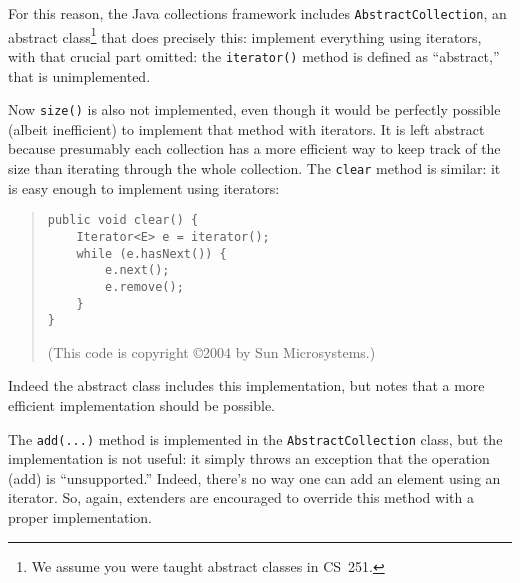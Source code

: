 For this reason, the Java collections framework includes
\verb|AbstractCollection|,
an abstract class\footnote{We assume you were taught abstract classes
  in CS~251.}
that does precisely this: implement
everything using iterators, with that crucial part omitted:
the \verb|iterator()| method is defined as ``abstract,'' that is
unimplemented.

Now \verb|size()| is also not implemented, even though it would be
perfectly possible (albeit inefficient) to implement that method with
iterators.  It is left abstract because presumably each collection has
a more efficient way to keep track of the size than iterating through
the whole collection.
The \verb|clear| method is similar: it is easy enough to implement
using iterators:
\begin{quote}
\begin{verbatim}
public void clear() {
    Iterator<E> e = iterator();
    while (e.hasNext()) {
        e.next();
        e.remove();
    }
}
\end{verbatim}
(This code is copyright \copyright 2004 by Sun Microsystems.)
\end{quote}
Indeed the abstract class includes this implementation, but notes that
a more efficient implementation should be possible.

The \verb|add(...)| method is implemented in the
\verb|AbstractCollection| class, but the implementation is not
useful: it simply throws an exception that the operation (add) is
``unsupported.''  Indeed, there's no way one can add an element using
an iterator.  So, again, extenders are encouraged to override this
method with a proper implementation.



